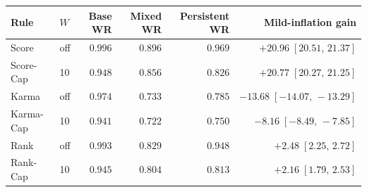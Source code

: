 \begin{tabular}{llrrrr}
\toprule
Rule & $W$ & Base WR & Mixed WR & Persistent WR & Mild-inflation gain \\
\midrule
Score & off & \(0.996\) & \(0.896\) & \(0.969\) & \(+20.96\;[20.51,\,21.37]\) \\
Score-Cap & 10 & \(0.948\) & \(0.856\) & \(0.826\) & \(+20.77\;[20.27,\,21.25]\) \\
Karma & off & \(0.974\) & \(0.733\) & \(0.785\) & \(-13.68\;[-14.07,\,-13.29]\) \\
Karma-Cap & 10 & \(0.941\) & \(0.722\) & \(0.750\) & \(-8.16\;[-8.49,\,-7.85]\) \\
Rank & off & \(0.993\) & \(0.829\) & \(0.948\) & \(+2.48\;[2.25,\,2.72]\) \\
Rank-Cap & 10 & \(0.945\) & \(0.804\) & \(0.813\) & \(+2.16\;[1.79,\,2.53]\) \\
\bottomrule
\end{tabular}
